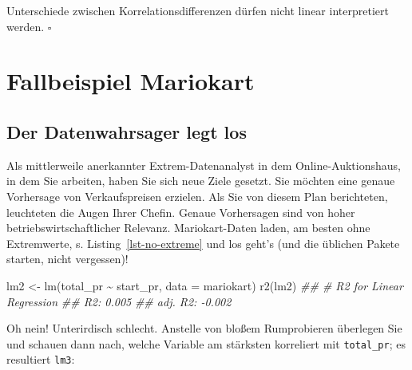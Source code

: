 \documentclass[
  letterpaper,
  twoside,
  open=any]{scrbook}
\newenvironment{Shaded}{\begin{snugshade}}{\end{snugshade}}
\newcommand{\AttributeTok}[1]{\textcolor[rgb]{0.40,0.45,0.13}{#1}}
\newcommand{\DocumentationTok}[1]{\textcolor[rgb]{0.37,0.37,0.37}{\textit{#1}}}
\newcommand{\FunctionTok}[1]{\textcolor[rgb]{0.28,0.35,0.67}{#1}}
\newcommand{\NormalTok}[1]{\textcolor[rgb]{0.00,0.23,0.31}{#1}}
\newcommand{\OtherTok}[1]{\textcolor[rgb]{0.00,0.23,0.31}{#1}}
\newcommand{\SpecialCharTok}[1]{\textcolor[rgb]{0.37,0.37,0.37}{#1}}
\theoremstyle{definition}
\theoremstyle{definition}
\theoremstyle{definition}
\theoremstyle{remark}
\begin{document}
\begin{tcolorbox}[enhanced jigsaw, colbacktitle=quarto-callout-caution-color!10!white, colframe=quarto-callout-caution-color-frame, coltitle=black, arc=.35mm, breakable, opacitybacktitle=0.6, toprule=.15mm, colback=white, rightrule=.15mm, opacityback=0, toptitle=1mm, title=\textcolor{quarto-callout-caution-color}{\faFire}\hspace{0.5em}{Vorsicht}, titlerule=0mm, bottomtitle=1mm, bottomrule=.15mm, leftrule=.75mm, left=2mm]

Unterschiede zwischen Korrelationsdifferenzen dürfen nicht linear
interpretiert werden. \(\square\)

\end{tcolorbox}

\section{Fallbeispiel Mariokart}\label{fallbeispiel-mariokart}

\subsection{Der Datenwahrsager legt
los}\label{der-datenwahrsager-legt-los}

Als mittlerweile anerkannter Extrem-Datenanalyst in dem
Online-Auktionshaus, in dem Sie arbeiten, haben Sie sich neue Ziele
gesetzt. Sie möchten eine genaue Vorhersage von Verkaufspreisen
erzielen. Als Sie von diesem Plan berichteten, leuchteten die Augen
Ihrer Chefin. Genaue Vorhersagen sind von hoher betriebswirtschaftlicher
Relevanz. Mariokart-Daten laden, am besten ohne Extremwerte, s.
Listing~\ref{lst-no-extreme} und los geht's (und die üblichen Pakete
starten, nicht vergessen)!

\begin{Shaded}
\begin{Highlighting}[]
\NormalTok{lm2 }\OtherTok{\textless{}{-}} \FunctionTok{lm}\NormalTok{(total\_pr }\SpecialCharTok{\textasciitilde{}}\NormalTok{ start\_pr, }\AttributeTok{data =}\NormalTok{ mariokart)}
\FunctionTok{r2}\NormalTok{(lm2)}
\DocumentationTok{\#\# \# R2 for Linear Regression}
\DocumentationTok{\#\#        R2: 0.005}
\DocumentationTok{\#\#   adj. R2: {-}0.002}
\end{Highlighting}
\end{Shaded}

Oh nein! Unterirdisch schlecht. Anstelle von bloßem Rumprobieren
überlegen Sie und schauen dann nach, welche Variable am stärksten
korreliert mit \texttt{total\_pr}; es resultiert \texttt{lm3}:
\end{document}
